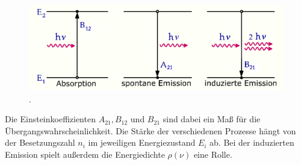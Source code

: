 \begin{figure}[H]
    \centering
    \includegraphics[scale=0.7]{Abbildungen/Prozesse.png}
    \caption{.\cite{prozess}}
    \label{fig:Aufbau2}
\end{figure}
Die Einsteinkoeffizienten $A_{21}, B_{12}$ und $B_{21}$ sind dabei ein Maß für die Übergangswahrscheinlichkeit.
Die Stärke der verschiedenen Prozesse hängt von der Besetzungszahl $n_i$ im jeweiligen Energiezustand $E_i$ ab.
Bei der induzierten Emission spielt außerdem die Energiedichte $\rho(\nu)$ eine Rolle.

